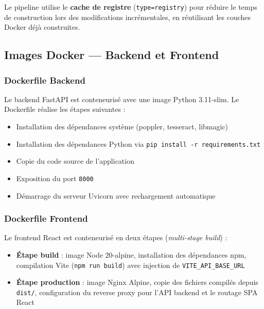 \vspace{0.5em}

Le pipeline utilise le \textbf{cache de registre} (\texttt{type=registry}) pour réduire le temps de construction lors des modifications incrémentales, en réutilisant les couches Docker déjà construites.

\subsection{Images Docker — Backend et Frontend}

\subsubsection{Dockerfile Backend}

Le backend FastAPI est conteneurisé avec une image Python 3.11-slim. Le Dockerfile réalise les étapes suivantes :

\begin{itemize}[label=--]
    \item Installation des dépendances système (poppler, tesseract, libmagic)
    \item Installation des dépendances Python via \texttt{pip install -r requirements.txt}
    \item Copie du code source de l’application
    \item Exposition du port \texttt{8000}
    \item Démarrage du serveur Uvicorn avec rechargement automatique
\end{itemize}

\subsubsection{Dockerfile Frontend}

Le frontend React est conteneurisé en deux étapes (\textit{multi-stage build}) :

\begin{itemize}[label=--]
    \item \textbf{Étape build} : image Node 20-alpine, installation des dépendances npm, compilation Vite (\texttt{npm run build}) avec injection de \texttt{VITE\_API\_BASE\_URL}
    \item \textbf{Étape production} : image Nginx Alpine, copie des fichiers compilés depuis \texttt{dist/}, configuration du reverse proxy pour l’API backend et le routage SPA React
\end{itemize}

